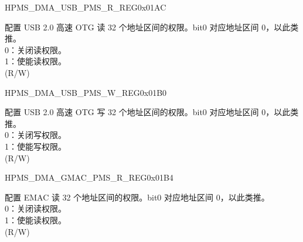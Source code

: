 \begin{register}{H}{PMS\_DMA\_USB\_PMS\_R\_REG}{0x01AC}\label{regdesc:PMSDMAUSBPMSRREG}
%
\regnewline%
\begin{regdesc}\begin{reglist}
\label{fielddesc:PMSDMAUSBRPMS}\item [PMS\_DMA\_USB\_R\_PMS] 配置 USB 2.0 高速 OTG 读 32 个地址区间的权限。bit0 对应地址区间 0，以此类推。\\
0：关闭读权限。\\
1：使能读权限。\\ (R/W)
\end{reglist}\end{regdesc}
\end{register}


\begin{register}{H}{PMS\_DMA\_USB\_PMS\_W\_REG}{0x01B0}\label{regdesc:PMSDMAUSBPMSWREG}
%
\regnewline%
\begin{regdesc}\begin{reglist}
\label{fielddesc:PMSDMAUSBWPMS}\item [PMS\_DMA\_USB\_W\_PMS] 配置 USB 2.0 高速 OTG 写 32 个地址区间的权限。bit0 对应地址区间 0，以此类推。\\
0：关闭写权限。\\
1：使能写权限。\\ (R/W)
\end{reglist}\end{regdesc}
\end{register}


\begin{register}{H}{PMS\_DMA\_GMAC\_PMS\_R\_REG}{0x01B4}\label{regdesc:PMSDMAGMACPMSRREG}
%
\regnewline%
\begin{regdesc}\begin{reglist}
\label{fielddesc:PMSDMAGMACRPMS}\item [PMS\_DMA\_GMAC\_R\_PMS] 配置 EMAC 读 32 个地址区间的权限。bit0 对应地址区间 0，以此类推。\\
0：关闭读权限。\\
1：使能读权限。\\ (R/W)
\end{reglist}\end{regdesc}
\end{register}


